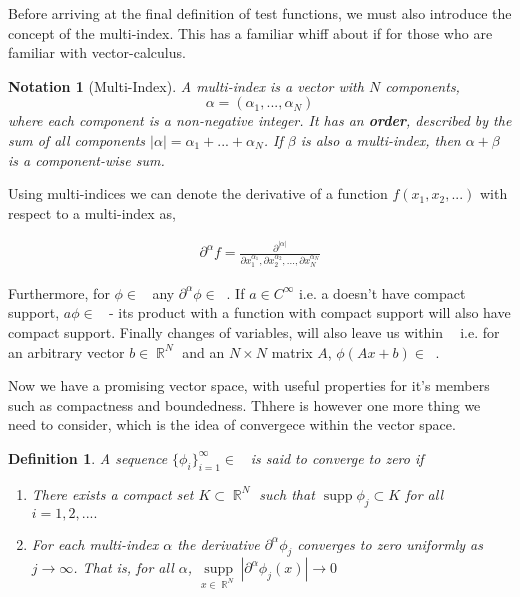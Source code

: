 \documentclass[12pt, a4]{article}
\newtheorem{definition}{Definition}[section]
\newtheorem{notation}{Notation}[section]
\DeclareMathOperator\supp{supp}
\DeclareMathOperator\reals{\mathbb{R}}
\DeclareMathOperator\tfspace{C_0^\infty}
\begin{document}
Before arriving at the final definition of test functions, we must also introduce the concept of the multi-index. This has a familiar whiff about if for those who are familiar with vector-calculus.

\begin{notation}[Multi-Index]
    A multi-index is a vector with $N$ components, \[ \alpha=(\alpha_1,...,\alpha_N) \] where each component is a non-negative integer. It has an \textbf{order}, described by the sum of all components $|\alpha| = \alpha_1+...+\alpha_N$. If $\beta$ is also a multi-index, then $\alpha+\beta$ is a component-wise sum.
\end{notation}

Using multi-indices we can denote the derivative of a function $f(x_1,x_2,...)$ with respect to a multi-index as,

\begin{eqnarray}
    \partial^\alpha f = \frac{\partial^{|\alpha|}}{\partial x_1^{\alpha_1}, \partial x_2^{\alpha_2}, ..., \partial x_N^{\alpha_N}}
\end{eqnarray}

Furthermore, for $\phi \in \tfspace$ any $\partial^\alpha \phi \in \tfspace$. If $a \in C^\infty$ i.e. a doesn't have compact support, $a\phi \in \tfspace$ - its product with a function with compact support will also have compact support. Finally changes of variables, will also leave us within $\tfspace$ i.e. for an arbitrary vector $b \in \reals^N$ and an $N \times N$ matrix $A$, $\phi(Ax+b) \in \tfspace$.

Now we have a promising vector space, with useful properties for it's members such as compactness and boundedness. Thhere is however one more thing we need to consider, which is the idea of convergece within the vector space.

\begin{definition}
    A sequence $\{\phi_i\}^\infty_{i=1} \in \tfspace $ is said to converge to zero if
    \begin{enumerate}
        \item There exists a compact set $K \subset \reals^N$ such that $\supp \phi_j \subset K$ for all $i=1,2,....$
        \item For each multi-index $\alpha$ the derivative $\partial^\alpha \phi_j$ converges to zero uniformly as $j \rightarrow \infty$. That is, for all $\alpha$, $\underset{x \in \reals^N}{\supp} |\partial^\alpha \phi_j(x)|\rightarrow 0$
    \end{enumerate}
\end{definition}
\end{document}
